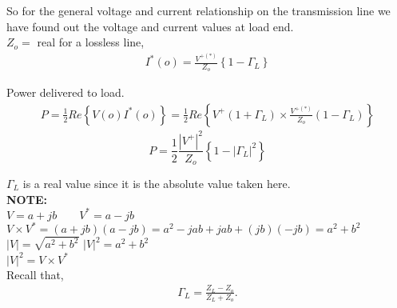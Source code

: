 So for the general voltage and current relationship on the transmission line we have found  out the voltage and current values at load end.\\

$Z_o= $ real for a lossless line,\\
\begin{align*}
I^\ast (o) =\frac{V^{+ (\ast )}}{Z_o}\left\lbrace 1 -\Gamma_L \right\rbrace
\end{align*}

Power delivered to load.
\begin{align*}
P= \frac{1}{2} Re\left\lbrace V(o) I^*(o) \right\rbrace = \frac{1}{2} Re\left\lbrace V^+(1+\Gamma_L) \times \frac{V^{+(*)}}{Z_o} (1-\Gamma_L)\right\rbrace
\end{align*}
\begin{equation}
P= \frac{1}{2} \frac{|V^+|^2}{Z_o} \left\lbrace 1 -|\Gamma_L|^2 \right\rbrace 
\end{equation}

$\Gamma_L$ is a real value since it is the absolute value taken here.\\

 \textbf{NOTE:}  \\

 $V= a + jb  \quad \quad V^*= a -jb$\\

$ V\times V^* = ( a + jb)(a-jb)= a^2 - jab + jab + (jb) (-jb)= a^2 + b^2 $ \\

$| V |= \sqrt{a^2 + b^2} $ \quad \quad $|V|^2 = a^2 + b^2 $ \\

$| V |^2 = V \times V^* $ \\

Recall that,
\begin{align*}\Gamma_L = \frac{ Z_L -Z_o }{ Z_L + Z_o }.
\end{align*}

